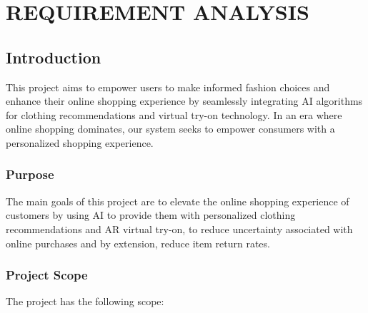 \chapter{REQUIREMENT ANALYSIS}


\section{Introduction}
	This project aims to empower users to make informed fashion choices and enhance their online shopping experience by seamlessly integrating AI algorithms for clothing recommendations and virtual try-on technology. In an era where online shopping dominates, our system seeks to empower consumers with a personalized shopping experience.

	\subsection{Purpose}
		The main goals of this project are to elevate the online shopping experience of customers by using AI to provide them with personalized clothing recommendations and AR virtual try-on, to reduce uncertainty associated with online purchases and by extension, reduce item return rates.

	\subsection{Project Scope}
		The project has the following scope:

